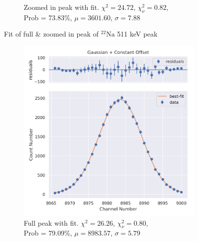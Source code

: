 \documentclass[11pt,a4paper]{article}
\newcommand{\element}[2]{$^{#2}\textrm{#1}$}
\begin{document}
\begin{figure}[H]
\begin{subfigure}{.5\linewidth}
    \caption{Zoomed in peak with fit. $\chi^2 = 24.72$, $\chi^2_\nu = 0.82$, \\ Prob = 73.83\%, $\mu = 3601.60$, $\sigma = 7.88$}
  \end{subfigure}
  \caption{Fit of full \& zoomed in peak of \element{Na}{22} 511 keV peak}
\end{figure}
\begin{figure}[H]
  \centering
  \begin{subfigure}{.48\linewidth}
    \centering
    \includegraphics[width=\linewidth]{./Images/Sodium22/Gauss/Gauss_2_Full.png}
    \caption{Full peak with fit. $\chi^2 = 26.26$, $\chi^2_\nu = 0.80$, \\ Prob = 79.09\%, $\mu = 8983.57$, $\sigma = 5.79$}
  \end{subfigure} 
  \begin{subfigure}{.48\linewidth}
    \centering

\end{subfigure}
\end{figure}
\end{document}
